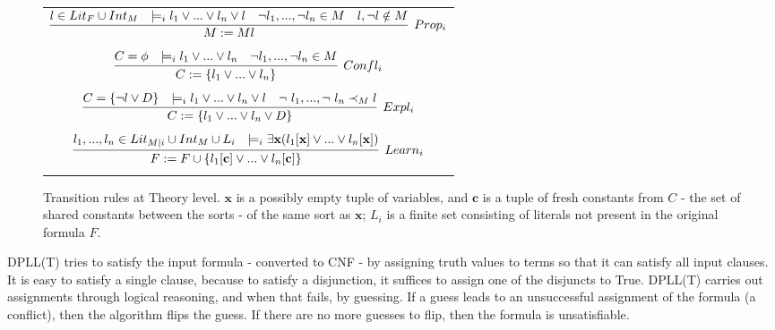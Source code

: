 \documentclass{article}
\begin{document}
\begin{figure}[t]
	\centering
	\begin{framed}
		\begin{tabular}{c}
			
			$\infer[Prop_i]{M := Ml}	{l \in Lit_F \cup Int_M & 
				\models_i l_1 \lor ... \lor 
				l_n \lor l & \neg l_1, ..., \neg l_n \in M & l,\neg l \notin M}$ \\ \\
			$\infer[Confl_i]{C := \{l_1 \lor ... \lor l_n \}}
			{C = \phi & \models_i l_1 \lor ... \lor l_n & 
				\neg l_1, ..., \neg l_n \in M}$ \\ \\
			$\infer[Expl_i]{C := \{l_1 \lor ... \lor l_n \lor D\}}
			{C = \{\neg l \lor D\} & \models_i l_1 \lor ... \lor l_n \lor l & 
				\neg\ l_1, ..., \neg\ l_n \prec_M l}$ \\ \\
			$\infer[Learn_i]{F := F \cup \{l_1[\textbf{c}] 
				\lor ... \lor l_n[\textbf{c}]\}}
			{l_1,...,l_n \in Lit_{M|i} \cup Int_M \cup L_i & 
				\models_i \exists \textbf{x}(l_1[\textbf{x}] \lor ... 
				\lor l_n[\textbf{x}])}$ \\ \\
		\end{tabular}
	\end{framed}
	\caption{Transition rules at Theory level. $\textbf{x}$ is a possibly empty 
		tuple of variables, and $\textbf{c}$ is a tuple of fresh constants 
		from $C$ - the set of shared constants between the sorts - of the
		same sort as $\textbf{x}$; $L_i$ is a finite set consisting of literals
		not present in the original formula $F$.}
	\label{fig:theoryrules}
\end{figure}

DPLL(T) tries to satisfy the input formula - converted to 
CNF - by assigning truth values to terms so that it can
satisfy all input clauses. It is easy to satisfy a single
clause, because to satisfy a disjunction, it suffices to
assign one of the disjuncts to True. DPLL(T) carries out
assignments through logical reasoning, and when that 
fails, by guessing. If a
guess leads to an unsuccessful assignment of the formula 
(a conflict), then the algorithm flips the guess. 
If there are no more guesses to flip, then the formula is
unsatisfiable.
\end{document}
